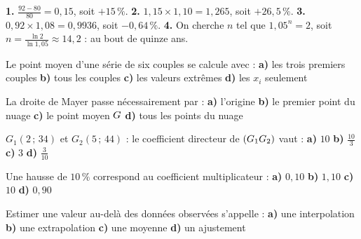 \begin{corrige}[pourcentages]
\textbf{1.} $\frac{92-80}{80} = 0{,}15$, soit $+15\,\%$.
\textbf{2.} $1{,}15\times1{,}10 = 1{,}265$, soit $+26{,}5\,\%$.
\textbf{3.} $0{,}92\times1{,}08 = 0{,}9936$, soit $-0{,}64\,\%$.
\textbf{4.} On cherche $n$ tel que $1{,}05^{n} = 2$, soit
$n = \frac{\ln2}{\ln1{,}05} \approx 14{,}2$ : au bout de quinze ans.
\end{corrige}

\begin{qcm}
\exo Le point moyen d'une série de six couples se calcule avec :
\textbf{a)} les trois premiers couples \quad \textbf{b)} tous les couples
\quad \textbf{c)} les valeurs extrêmes \quad \textbf{d)} les $x_{i}$
seulement 

\exo La droite de Mayer passe nécessairement par :
\textbf{a)} l'origine \quad \textbf{b)} le premier point du nuage \quad
\textbf{c)} le point moyen $G$ \quad \textbf{d)} tous les points du
nuage 

\exo $G_{1}(2\,;\,34)$ et $G_{2}(5\,;\,44)$ : le coefficient directeur de
$(G_{1}G_{2})$ vaut :
\textbf{a)} $10$ \quad \textbf{b)} $\frac{10}{3}$ \quad \textbf{c)} $3$
\quad \textbf{d)} $\frac{3}{10}$ 

\exo Une hausse de $10\,\%$ correspond au coefficient multiplicateur :
\textbf{a)} $0{,}10$ \quad \textbf{b)} $1{,}10$ \quad \textbf{c)} $10$
\quad \textbf{d)} $0{,}90$ 

\exo Estimer une valeur au-delà des données observées s'appelle :
\textbf{a)} une interpolation \quad \textbf{b)} une extrapolation \quad
\textbf{c)} une moyenne \quad \textbf{d)} un ajustement 
\end{qcm}

